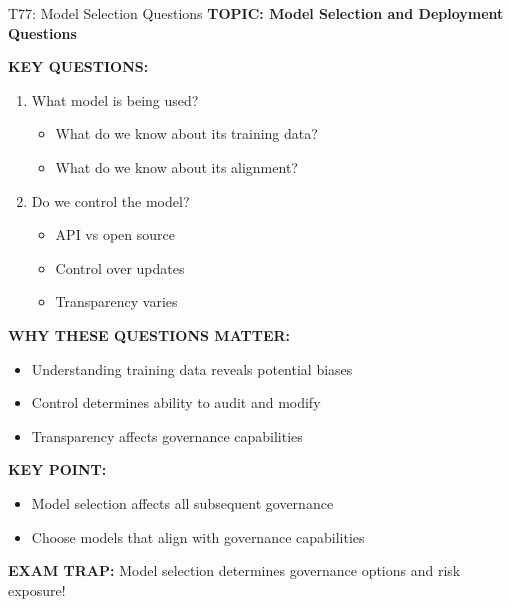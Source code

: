 \documentclass[8pt]{beamer}
\begin{document}
	\begin{frame}{T77: Model Selection Questions}
		\fontsize{6.5}{7.5}\selectfont
		\textbf{TOPIC: Model Selection and Deployment Questions}
		
		\vspace{0.1cm}
		\textbf{KEY QUESTIONS:}
		\begin{enumerate}
			\item \textcolor{myblue}{What model is being used?}
			\begin{itemize}
				\item What do we know about its training data?
				\item What do we know about its alignment?
			\end{itemize}
			\item \textcolor{myblue}{Do we control the model?}
			\begin{itemize}
				\item API vs open source
				\item Control over updates
				\item Transparency varies
			\end{itemize}
		\end{enumerate}
		
		\vspace{0.1cm}
		\textbf{WHY THESE QUESTIONS MATTER:}
		\begin{itemize}
			\item Understanding training data reveals potential biases
			\item Control determines ability to audit and modify
			\item Transparency affects governance capabilities
		\end{itemize}
		
		\vspace{0.1cm}
		\textbf{KEY POINT:}
		\begin{itemize}
			\item Model selection affects all subsequent governance
			\item Choose models that align with governance capabilities
		\end{itemize}
		
		\textcolor{myred}{\textbf{EXAM TRAP:}} Model selection determines \textcolor{myblue}{governance options and risk exposure}!
	\end{frame}
	
\end{document}
